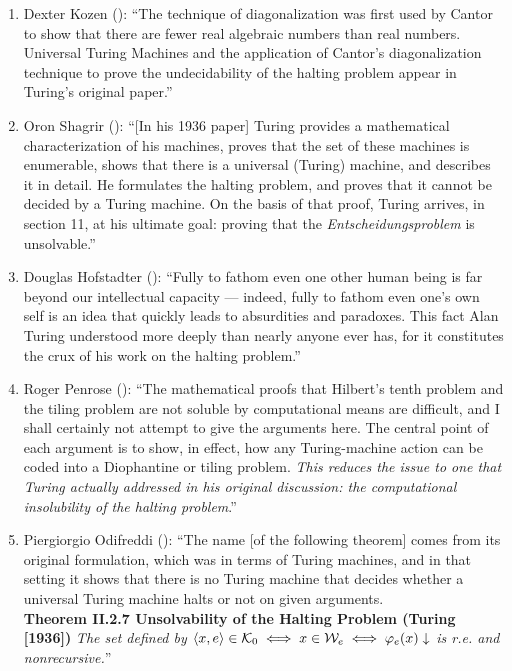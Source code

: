 \documentclass{amsart}
\begin{document}
\begin{enumerate}
    \bigskip


    \item Dexter Kozen (\cite[pp. 243-244]{kozen2012automata}): \enquote{The technique of diagonalization was first used by Cantor to show that there are fewer real algebraic numbers than real numbers. Universal Turing Machines and the application of Cantor's diagonalization technique to prove the undecidability of the halting problem appear in Turing's original paper.} 

    \bigskip 

    \item Oron Shagrir (\cite[p. 3]{shagrir2006godel}): \enquote{[In his 1936 paper] Turing provides a mathematical characterization of his machines, proves that the set of these machines is enumerable, shows that there is a universal (Turing) machine, and describes it in detail. He formulates the halting problem, and proves that it cannot be decided by a Turing machine. On the basis of that proof, Turing arrives, in section 11, at his ultimate goal: proving that the \textit{Entscheidungsproblem} is unsolvable.}

    \bigskip

    \item Douglas Hofstadter (\cite[p. XII]{hofstadter2004turing}): \enquote{Fully to fathom even one other human being is far beyond our intellectual capacity --- indeed, fully to fathom even one's own self is an idea that quickly leads to absurdities and paradoxes. This fact Alan Turing understood more deeply than nearly anyone ever has, for it constitutes the crux of his work on the halting problem.}

    \bigskip


    \item Roger Penrose (\cite[p. 30, our emphasis]{penrose1994shadows}): \enquote{The mathematical proofs that Hilbert's tenth problem and the tiling problem are not soluble by computational means are difficult, and I shall certainly not attempt to give the arguments here. The central point of each argument is to show, in effect, how any Turing-machine action can be coded into a Diophantine or tiling problem. \textit{This reduces the issue to one that Turing actually addressed in his original discussion: the computational insolubility of the halting problem}.}

    \bigskip

\enlargethispage{20pt}
    \item Piergiorgio Odifreddi (\cite[p. 150]{odifreddi1992classical}):
    \enquote{The name [of the following theorem] comes from its original formulation, which was in terms of Turing machines, and in that setting it shows that there is no Turing machine that decides whether a universal Turing machine halts or not on given arguments.\\[1ex] 
    \textbf{Theorem II.2.7 Unsolvability of the Halting Problem (Turing [1936])} \textit{The set defined by $\braket{x,e} \in \mathcal{K}_0 \iff x \in \mathcal{W}_e \iff \varphi_e(x)\downarrow$ is r.e. and nonrecursive.}}


\end{enumerate}
\end{document}
